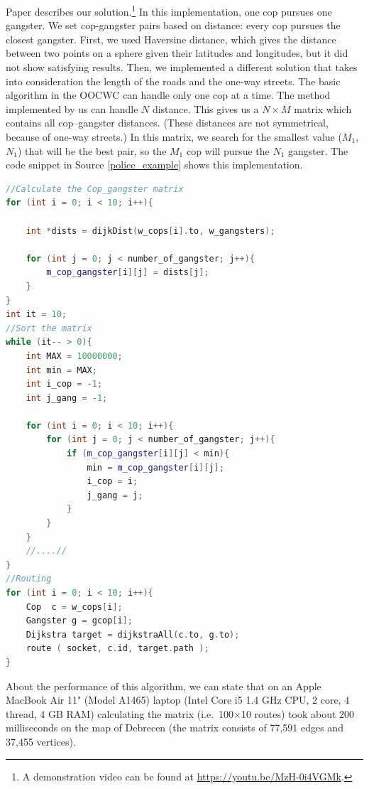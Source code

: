 \documentclass[b5paper,12pt]{report}
\theoremstyle{definition}
\begin{document}
Paper \cite{forkcoginfocom} describes our solution.\footnote{A demonstration video can be found at \url{https://youtu.be/MzH-0i4VGMk}.} In this implementation, one cop pursues one gangster. We set cop-gangster pairs based on distance: every cop pursues the closest gangster. First, we used Haversine distance, which gives the distance between two points on a sphere given their latitudes and longitudes, but it did not show satisfying results. Then, we implemented a different solution that takes into consideration the length of the roads and the one-way streets. The basic algorithm in the OOCWC can handle only one cop at a time. The method implemented by us can handle $N$ distance. This gives us a $N\times M$ matrix which contains all cop--gangster distances. (These distances are not symmetrical, because of one-way streets.) In this matrix, we search for the smallest value ($M_1$, $N_1$) that will be the best pair, so the $M_1$ cop will pursue the $N_1$ gangster. The code snippet in Source \ref{police_example} shows this implementation.

\begin{lstlisting}[language=C++,caption=Code snippet of the algortihm created for the Police Edition., label=police_example]
//Calculate the Cop_gangster matrix
for (int i = 0; i < 10; i++){
    
    int *dists = dijkDist(w_cops[i].to, w_gangsters);
    
    for (int j = 0; j < number_of_gangster; j++){
        m_cop_gangster[i][j] = dists[j];
    }
}
int it = 10;
//Sort the matrix
while (it-- > 0){
    int MAX = 10000000;
    int min = MAX;
    int i_cop = -1;
    int j_gang = -1;
    
    for (int i = 0; i < 10; i++){
        for (int j = 0; j < number_of_gangster; j++){
            if (m_cop_gangster[i][j] < min){
                min = m_cop_gangster[i][j];
                i_cop = i;
                j_gang = j;
            }
        }
    }
    //....//
}
//Routing
for (int i = 0; i < 10; i++){
    Cop  c = w_cops[i];
    Gangster g = gcop[i];
    Dijkstra target = dijkstraAll(c.to, g.to);
    route ( socket, c.id, target.path );
}
\end{lstlisting}

About the performance of this algorithm, we can state that on an Apple MacBook Air 11" (Model A1465) laptop (Intel Core i5 1.4 GHz CPU, 2 core, 4 thread, 4 GB RAM) calculating the matrix (i.e.~100$\times$10 routes) took about 200 milliseconds on the map of Debrecen (the matrix consists of 77,591 edges and 37,455 vertices).
\end{document}
